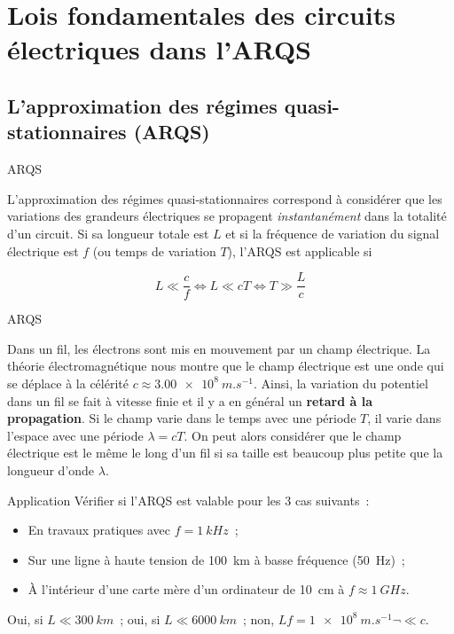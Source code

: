 \documentclass[../main/main.tex]{subfiles}
\begin{document}
\section{Lois fondamentales des circuits électriques dans l'ARQS}

\subsection{L'approximation des régimes quasi-stationnaires (ARQS)}

\begin{tcbraster}[raster columns=2, raster equal height=rows]
    \begin{loi}[label=loi:arqs]{ARQS}

        L'approximation des régimes quasi-stationnaires correspond à considérer
        que les variations des grandeurs électriques se propagent
        \textit{instantanément} dans la totalité d'un circuit. Si sa longueur
        totale est $L$ et si la fréquence de variation du signal électrique est
        $f$ (ou temps de variation $T$), l'ARQS est applicable si

        \[ L \ll \frac{c}{f} \Longleftrightarrow \boxed{L \ll cT} \Longleftrightarrow T \gg
        \frac{L}{c}\]
    \end{loi}
    \begin{demo}[label=demo:arqs]{ARQS}
    
        Dans un fil, les électrons sont mis en mouvement par un champ
        électrique. La théorie électromagnétique nous montre que le champ
        électrique est une onde qui se déplace à la célérité $c \approx
        \SI{3.00e8}{m.s^{-1}}$. Ainsi, la variation du potentiel dans un fil se
        fait à vitesse finie et il y a en général un \textbf{retard à la
        propagation}. Si le champ varie dans le temps avec une période $T$, il
        varie dans l'espace avec une période $\lambda = cT$. On peut alors
        considérer que le champ électrique est le même le long d'un fil si sa
        taille est beaucoup plus petite que la longueur d'onde $\lambda$.
    \end{demo}
\end{tcbraster}
\begin{NCcexe}[width=\linewidth]{Application}
    Vérifier si l'ARQS est valable pour les 3 cas suivants~:
    \begin{itemize}
        \item En travaux pratiques avec $f = \SI{1}{kHz}$~;
        \item Sur une ligne à haute tension de \SI{100}{km} à basse fréquence
            (\SI{50}{Hz})~;
        \item À l'intérieur d'une carte mère d'un ordinateur de \SI{10}{cm} à
            $f \approx \SI{1}{GHz}$.
    \end{itemize}
    \tcblower
    Oui, si $L \ll \SI{300}{km}$~; oui, si $L \ll \SI{6000}{km}$~; non, $Lf =
    \SI{1e8}{m.s^{-1}} \neg\ll c$.
\end{NCcexe}
\end{document}
